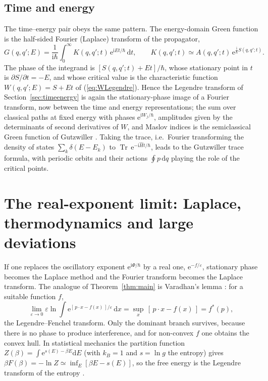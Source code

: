 \documentclass[11pt,a4paper]{article}
\newcommand{\ii}{\mathrm{i}}
\newcommand{\dd}{\mathrm{d}}
\newcommand{\ee}{\mathrm{e}}
\newcommand{\hb}{\hbar}
\newcommand{\op}[1]{\hat{#1}}
\theoremstyle{plain}
\theoremstyle{definition}
\theoremstyle{remark}
\begin{document}
\subsection{Time and energy}

The time--energy pair obeys the same pattern. The energy-domain Green function is the half-sided Fourier (Laplace) transform of the propagator,
\begin{equation}
G(q,q';E)=\frac{1}{\ii\hb}\int_0^\infty K(q,q';t)\,\ee^{\ii Et/\hb}\,\dd t,\qquad K(q,q';t)\simeq A(q,q';t)\,\ee^{\frac{\ii}{\hb}S(q,q';t)} .
\end{equation}
The phase of the integrand is $[S(q,q';t)+Et]/\hb$, whose stationary point in $t$ is $\partial S/\partial t=-E$, and whose critical value is the characteristic function $W(q,q';E)=S+Et$ of (\ref{eq:WLegendre}). Hence the Legendre transform of Section~\ref{sec:timeenergy} is again the stationary-phase image of a Fourier transform, now between the time and energy representations; the sum over classical paths at fixed energy with phases $\ee^{\ii W_j/\hb}$, amplitudes given by the determinants of second derivatives of $W$, and Maslov indices is the semiclassical Green function of Gutzwiller \cite{Gutzwiller}. Taking the trace, i.e.\ Fourier transforming the density of states $\sum_k\delta(E-E_k)$ to $\operatorname{Tr}\,\ee^{-\ii\op Ht/\hb}$, leads to the Gutzwiller trace formula, with periodic orbits and their actions $\oint p\,\dd q$ playing the role of the critical points.

\section{The real-exponent limit: Laplace, thermodynamics and large deviations}\label{sec:laplace}

If one replaces the oscillatory exponent $\ee^{\ii\Phi/\hb}$ by a real one, $\ee^{-f/\varepsilon}$, stationary phase becomes the Laplace method and the Fourier transform becomes the Laplace transform. The analogue of Theorem~\ref{thm:main} is Varadhan's lemma \cite{Varadhan,Touchette}: for a suitable function $f$,
\begin{equation}
\lim_{\varepsilon\to0}\varepsilon\ln\int\ee^{[\,p\cdot x-f(x)\,]/\varepsilon}\,\dd x=\sup_x\,[\,p\cdot x-f(x)\,]=f^*(p),
\end{equation}
the Legendre--Fenchel transform. Only the dominant branch survives, because there is no phase to produce interference, and for non-convex $f$ one obtains the convex hull. In statistical mechanics the partition function $Z(\beta)=\int\ee^{s(E)-\beta E}\dd E$ (with $k_B=1$ and $s=\ln g$ the entropy) gives $\beta F(\beta)=-\ln Z\simeq\inf_E[\beta E-s(E)]$, so the free energy is the Legendre transform of the entropy \cite{Callen,Touchette,Zia}. 
\end{document}
